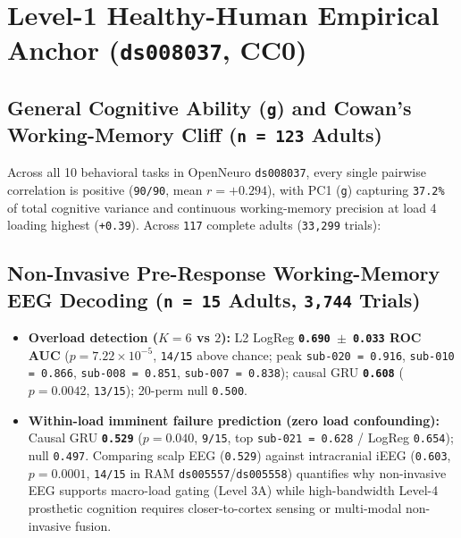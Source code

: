 \documentclass[11pt,a4paper]{article}
\begin{document}
\section{Level-1 Healthy-Human Empirical Anchor (\texttt{ds008037}, CC0)}
\subsection{General Cognitive Ability (\texttt{g}) and Cowan's Working-Memory Cliff (\texttt{n = 123} Adults)}
Across all 10 behavioral tasks in OpenNeuro \texttt{ds008037}, every single pairwise correlation is positive (\texttt{90/90}, mean $r = +0.294$), with PC1 (\texttt{g}) capturing \texttt{37.2\%} of total cognitive variance and continuous working-memory precision at load 4 loading highest (\texttt{+0.39}). Across \texttt{117} complete adults (\texttt{33,299} trials):

\begin{table}[htbp]
\centering
\small
{}
\end{table}
\subsection{Non-Invasive Pre-Response Working-Memory EEG Decoding (\texttt{n = 15} Adults, \texttt{3,744} Trials)}
\begin{itemize}
\item \textbf{Overload detection ($K = 6$ vs $2$):} L2 LogReg \textbf{\texttt{0.690 $\pm$ 0.033} ROC AUC} ($p = 7.22 \times 10^{-5}$, \texttt{14/15} above chance; peak \texttt{sub-020 = 0.916}, \texttt{sub-010 = 0.866}, \texttt{sub-008 = 0.851}, \texttt{sub-007 = 0.838}); causal GRU \textbf{\texttt{0.608}} ($p = 0.0042$, \texttt{13/15}); 20-perm null \texttt{0.500}.
\item \textbf{Within-load imminent failure prediction (zero load confounding):} Causal GRU \textbf{\texttt{0.529}} ($p = 0.040$, \texttt{9/15}, top \texttt{sub-021 = 0.628} / LogReg \texttt{0.654}); null \texttt{0.497}. Comparing scalp EEG (\texttt{0.529}) against intracranial iEEG (\texttt{0.603}, $p = 0.0001$, \texttt{14/15} in RAM \texttt{ds005557}/\texttt{ds005558}) quantifies why non-invasive EEG supports macro-load gating (Level 3A) while high-bandwidth Level-4 prosthetic cognition requires closer-to-cortex sensing or multi-modal non-invasive fusion.
\end{itemize}
\end{document}
